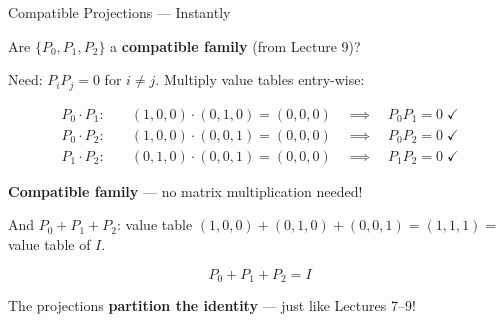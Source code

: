 \documentclass[10pt]{beamer}
\theoremstyle{definition}
\newcommand{\x}[1]{\alert{\textbf{#1}}}
\begin{document}
%
%
\begin{frame}[shrink=5]{Compatible Projections --- Instantly}

Are $\{P_0, P_1, P_2\}$ a \x{compatible family} (from Lecture 9)?

Need: $P_i P_j = 0$ for $i \neq j$. \quad Multiply value tables entry-wise:

\vfill

\begin{align*}
P_0 \cdot P_1: \quad &(1,0,0) \cdot (0,1,0) = (0,0,0) \quad\implies\quad P_0 P_1 = 0 \;\checkmark \\[6pt]
P_0 \cdot P_2: \quad &(1,0,0) \cdot (0,0,1) = (0,0,0) \quad\implies\quad P_0 P_2 = 0 \;\checkmark \\[6pt]
P_1 \cdot P_2: \quad &(0,1,0) \cdot (0,0,1) = (0,0,0) \quad\implies\quad P_1 P_2 = 0 \;\checkmark
\end{align*}

\vfill\pause

\x{Compatible family} --- no matrix multiplication needed!

\vfill

And $P_0 + P_1 + P_2$: value table $(1,0,0)+(0,1,0)+(0,0,1) = (1,1,1) = $ value table of $I$.

$$\boxed{P_0 + P_1 + P_2 = I}$$

The projections \x{partition the identity} --- just like Lectures 7--9!

\end{frame}
\end{document}
